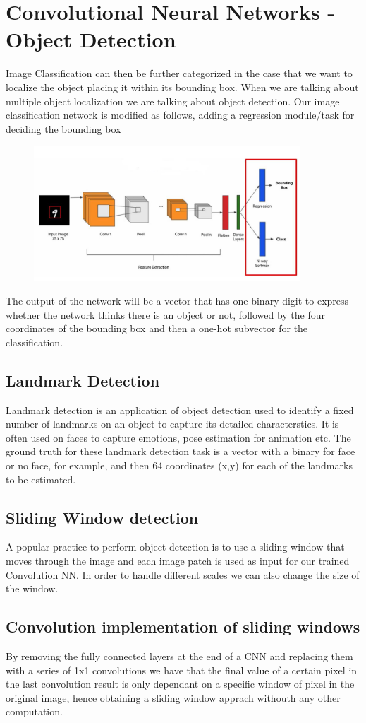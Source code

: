 \documentclass{article}
\begin{document}
\section{Convolutional Neural Networks - Object Detection}
Image Classification can then be further categorized in the case that we want to localize the object placing it within its bounding box. When we are talking about multiple object localization we are talking about object detection. Our image classification network is modified as follows, adding a regression module/task for deciding the bounding box
\begin{figure}[htbp]
    \centering
    \includegraphics[width = 10cm]{object-localization-network.png}
\end{figure}
The output of the network will be a vector that has one binary digit to express whether the network thinks there is an object or not, followed by the four coordinates of the bounding box and then a one-hot subvector for the classification.
\subsection*{Landmark Detection}
Landmark detection is an application of object detection used to identify a fixed number of landmarks on an object to capture its detailed characterstics. It is often used on faces to capture emotions, pose estimation for animation etc. The ground truth for these landmark detection task is a vector with a binary for face or no face, for example, and then 64 coordinates (x,y) for each of the landmarks to be estimated.
\subsection*{Sliding Window detection}
A popular practice to perform object detection is to use a sliding window that moves through the image and each image patch is used as input for our trained Convolution NN. In order to handle different scales we can also change the size of the window.
\subsection*{Convolution implementation of sliding windows}
By removing the fully connected layers at the end of a CNN and replacing them with a series of 1x1 convolutions we have that the final value of a certain pixel in the last convolution result is only dependant on a specific window of pixel in the original image, hence obtaining a sliding window apprach withouth any other computation. 
\end{document}
